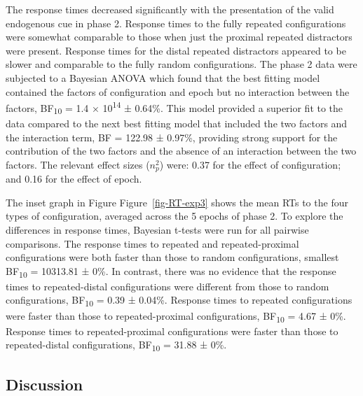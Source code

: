 \documentclass[
  man,
  floatsintext,
  longtable,
  nolmodern,
  notxfonts,
  notimes,
  colorlinks=true,linkcolor=blue,citecolor=blue,urlcolor=blue]{apa7}
\begin{document}
The response times decreased significantly with the presentation of the
valid endogenous cue in phase 2. Response times to the fully repeated
configurations were somewhat comparable to those when just the proximal
repeated distractors were present. Response times for the distal
repeated distractors appeared to be slower and comparable to the fully
random configurations. The phase 2 data were subjected to a Bayesian
ANOVA which found that the best fitting model contained the factors of
configuration and epoch but no interaction between the factors,
BF\textsubscript{10} = 1.4 × 10\textsuperscript{14} ± 0.64\%. This model
provided a superior fit to the data compared to the next best fitting
model that included the two factors and the interaction term, BF =
122.98 ± 0.97\%, providing strong support for the contribution of the
two factors and the absence of an interaction between the two factors.
The relevant effect sizes (\(n^2_p\)) were: 0.37 for the effect of
configuration; and 0.16 for the effect of epoch.

The inset graph in Figure Figure~\ref{fig-RT-exp3} shows the mean RTs to
the four types of configuration, averaged across the 5 epochs of phase
2. To explore the differences in response times, Bayesian t-tests were
run for all pairwise comparisons. The response times to repeated and
repeated-proximal configurations were both faster than those to random
configurations, smallest BF\textsubscript{10} = 10313.81 ± 0\%. In
contrast, there was no evidence that the response times to
repeated-distal configurations were different from those to random
configurations, BF\textsubscript{10} = 0.39 ± 0.04\%. Response times to
repeated configurations were faster than those to repeated-proximal
configurations, BF\textsubscript{10} = 4.67 ± 0\%. Response times to
repeated-proximal configurations were faster than those to
repeated-distal configurations, BF\textsubscript{10} = 31.88 ± 0\%.

\subsection{Discussion}\label{discussion-2}
\end{document}
